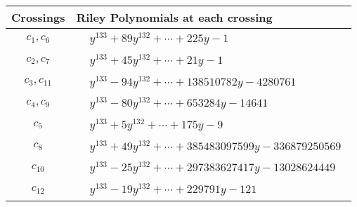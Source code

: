\documentclass[1p]{elsarticle_modified}
\theoremstyle{definition}
\begin{document}
\begin{tabular}{m{50pt}|m{274pt}}
Crossings & \hspace{64pt}Riley Polynomials at each crossing \\
\hline $$\begin{aligned}c_{1},c_{6}\end{aligned}$$&$\begin{aligned}
&y^{133}+89 y^{132}+\cdots+225 y-1
\end{aligned}$\\
\hline $$\begin{aligned}c_{2},c_{7}\end{aligned}$$&$\begin{aligned}
&y^{133}+45 y^{132}+\cdots+21 y-1
\end{aligned}$\\
\hline $$\begin{aligned}c_{3},c_{11}\end{aligned}$$&$\begin{aligned}
&y^{133}-94 y^{132}+\cdots+138510782 y-4280761
\end{aligned}$\\
\hline $$\begin{aligned}c_{4},c_{9}\end{aligned}$$&$\begin{aligned}
&y^{133}-80 y^{132}+\cdots+653284 y-14641
\end{aligned}$\\
\hline $$\begin{aligned}c_{5}\end{aligned}$$&$\begin{aligned}
&y^{133}+5 y^{132}+\cdots+175 y-9
\end{aligned}$\\
\hline $$\begin{aligned}c_{8}\end{aligned}$$&$\begin{aligned}
&y^{133}+49 y^{132}+\cdots+385483097599 y-336879250569
\end{aligned}$\\
\hline $$\begin{aligned}c_{10}\end{aligned}$$&$\begin{aligned}
&y^{133}-25 y^{132}+\cdots+297383627417 y-13028624449
\end{aligned}$\\
\hline $$\begin{aligned}c_{12}\end{aligned}$$&$\begin{aligned}
&y^{133}-19 y^{132}+\cdots+229791 y-121
\end{aligned}$\\
\hline
\end{tabular}\\~\\
\end{document}
